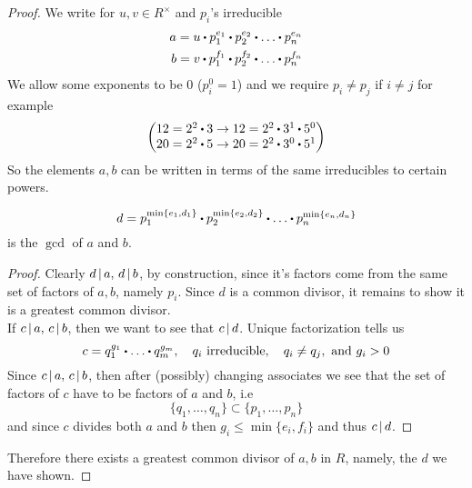 \documentclass[../Main.tex]{subfiles}
\begin{document}
\begin{proof}
	We write for $u,v\in R^\times$ and $p_i$'s irreducible
	\begin{align*}
	a=u\rdot p_1^{e_1}\rdot p_2^{e_2}\rdot \dots \rdot p_n^{e_n}\\
	b=v\rdot p_1^{f_1}\rdot p_2^{f_2}\rdot \dots \rdot p_n^{f_n}
	\end{align*}
	We allow some exponents to be $0$ ($p_i^0=1$) and we require $p_i\ne p_j$ if $i\ne j$ for example
	\[\begin{pmatrix}
	12=2^2\rdot 3 \to 12= 2^2\rdot 3^1\rdot 5^0 \\
	20=2^2\rdot 5 \to 20 =2^2\rdot 3^0\rdot 5^1 
	\end{pmatrix}\]
	So the elements $a,b$ can be written in terms of the same irreducibles to certain powers.
	\begin{claim}
		\[d=p_1^{\min\{e_1,d_1\}}\rdot p_2^{\min\{e_2,d_2\}}\rdot \dots \rdot p_n^{\min\{e_n,d_n\}}\]
		is the $\gcd$ of $a$ and $b$.
	\end{claim}
	\begin{proof}
		Clearly $d \, | \, a,\, d \, | \, b$, by construction, since it's factors come from the same set of factors of $a,b$, namely $p_i$. Since $d$ is a common divisor, it remains to show it is a greatest common divisor.\\
		If $c \, | \, a, \, c \, | \, b$, then we want to see that $c \, | \, d$. 
		Unique factorization tells us
		\[c=q_1^{g_1}\rdot \dots \rdot q_m^{g_m}, \quad q_i \text{ irreducible},\quad  q_i\ne q_j, \text{ and } g_i>0\]
		Since $c \, | \, a,\, c \, | \, b$, then after (possibly) changing associates we see that the set of factors of $c$ have to be factors of $a$ and $b$, i.e
		\[\{q_1,\dots,q_n\}\subset \{p_1,\dots,p_n\}\]
		and since $c$ divides both $a$ and $b$ then $g_i\le \min\{e_i,f_i\}$ and thus $c \, | \, d$.
	\end{proof}
	Therefore there exists a greatest common divisor of $a,b$ in $R$, namely, the $d$ we have shown.
\end{proof}
\end{document}
